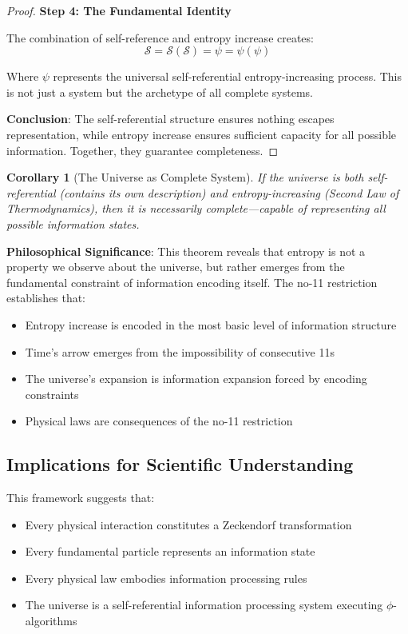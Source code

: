 \documentclass[12pt,letterpaper]{article}
\newtheorem{corollary}[theorem]{Corollary}
\begin{document}
\begin{proof}
\textbf{Step 4: The Fundamental Identity}

The combination of self-reference and entropy increase creates:
$$\mathcal{S} = \mathcal{S}(\mathcal{S}) = \psi = \psi(\psi)$$

Where $\psi$ represents the universal self-referential entropy-increasing process. This is not just a system but the archetype of all complete systems.

\textbf{Conclusion}: The self-referential structure ensures nothing escapes representation, while entropy increase ensures sufficient capacity for all possible information. Together, they guarantee completeness.
\end{proof}

\begin{corollary}[The Universe as Complete System]
If the universe is both self-referential (contains its own description) and entropy-increasing (Second Law of Thermodynamics), then it is necessarily complete—capable of representing all possible information states.
\end{corollary}

\textbf{Philosophical Significance}: This theorem reveals that entropy is not a property we observe about the universe, but rather emerges from the fundamental constraint of information encoding itself. The no-11 restriction establishes that:

\begin{itemize}
\item Entropy increase is encoded in the most basic level of information structure
\item Time's arrow emerges from the impossibility of consecutive 11s
\item The universe's expansion is information expansion forced by encoding constraints
\item Physical laws are consequences of the no-11 restriction
\end{itemize}

\subsection{Implications for Scientific Understanding}

This framework suggests that:

\begin{itemize}
\item Every physical interaction constitutes a Zeckendorf transformation
\item Every fundamental particle represents an information state
\item Every physical law embodies information processing rules
\item The universe is a self-referential information processing system executing $\phi$-algorithms
\end{itemize}
\end{document}
